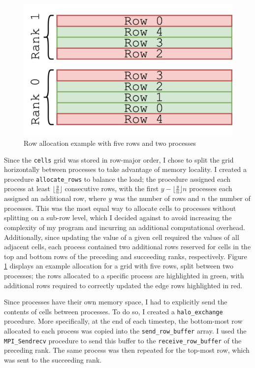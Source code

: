 \documentclass[twocolumn, a4paper]{article}
\begin{document}
\begin{figure}[htbp]
  \centering
  \includegraphics[width=.75\linewidth]{rows.png}
  \caption{Row allocation example with five rows and two processes}\label{fig:rows}
\end{figure}

Since the \texttt{cells} grid was stored in row-major order, I chose to split the grid horizontally between processes to take advantage of memory locality.
I created a procedure \texttt{allocate\_rows} to balance the load; the procedure assigned each process at least $\lfloor\frac{y}{n}\rfloor$ consecutive rows, with the first $y - \lfloor\frac{y}{n}\rfloor n$ processes each assigned an additional row, where $y$ was the number of rows and $n$ the number of processes.
This was the most equal way to allocate cells to processes without splitting on a sub-row level, which I decided against to avoid increasing the complexity of my program and incurring an additional computational overhead.
Additionally, since updating the value of a given cell required the values of all adjacent cells, each process contained two additional rows reserved for cells in the top and bottom rows of the preceding and succeeding ranks, respectively.
Figure \ref{fig:rows} displays an example allocation for a grid with five rows, split between two processes; the rows allocated to a specific process are highlighted in green, with additional rows required to correctly updated the edge rows highlighted in red.

Since processes have their own memory space, I had to explicitly send the contents of cells between processes.
To do so, I created a \texttt{halo\_exchange} procedure.
More specifically, at the end of each timestep, the bottom-most row allocated to each process was copied into the \texttt{send\_row\_buffer} array.
I used the \texttt{MPI\_Sendrecv} procedure to send this buffer to the \texttt{receive\_row\_buffer} of the preceding rank.
The same process was then repeated for the top-most row, which was sent to the succeeding rank.
\end{document}
